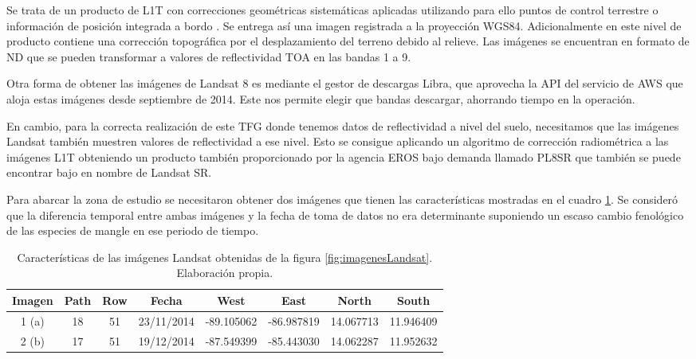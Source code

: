 Se trata de un producto de \ac{L1T} con correcciones geométricas sistemáticas aplicadas utilizando para ello puntos de control terrestre o información de posición integrada a bordo \citep{Ariza2013}. Se entrega así una imagen registrada a la proyección WGS84. Adicionalmente en este nivel de producto contiene una corrección topográfica por el desplazamiento del terreno debido al relieve. Las imágenes se encuentran en formato de \ac{ND} que se pueden transformar a valores de reflectividad \ac{TOA} en las bandas 1 a 9.%

Otra forma de obtener las imágenes de Landsat 8 es mediante el gestor de descargas Libra, que aprovecha la API del servicio de \ac{AWS} que aloja estas imágenes desde septiembre de 2014. Este nos permite elegir que bandas descargar, ahorrando tiempo en la operación.%

En cambio, para la correcta realización de este \ac{TFG} donde tenemos datos de reflectividad a nivel del suelo, necesitamos que las imágenes Landsat también muestren valores de reflectividad a ese nivel. Esto se consigue aplicando un algoritmo de corrección radiométrica a las imágenes \ac{L1T} obteniendo un producto también proporcionado por la agencia \ac{EROS} bajo demanda llamado \ac{PL8SR} \citep{USGS2015} que también se puede encontrar bajo en nombre de Landsat SR.%

Para abarcar la zona de estudio se necesitaron obtener dos imágenes que tienen las características mostradas en el cuadro \ref{tab:imagenes}. Se consideró que la diferencia temporal entre ambas imágenes y la fecha de toma de datos no era determinante suponiendo un escaso cambio fenológico de las especies de mangle en ese periodo de tiempo.%

\begin{table}[ht]
	\centering
	\begin{tabular}{@{}cccccccc@{}}
	\toprule[0.4mm]
	Imagen & Path & Row & Fecha & West & East & North & South \\
	\midrule
	1 (a) & 18 & 51 & 23/11/2014 & -89.105062 & -86.987819 & 14.067713 & 11.946409 \\
	2 (b) & 17 & 51 & 19/12/2014 & -87.549399 & -85.443030 & 14.062287 & 11.952632 \\
	\bottomrule[0.4mm]
	\end{tabular}
	\caption[Caracerísticas de las imágenes Landsat]{Características de las imágenes Landsat obtenidas de la figura \ref{fig:imagenesLandsat}. Elaboración propia.}
	\label{tab:imagenes}
\end{table}

